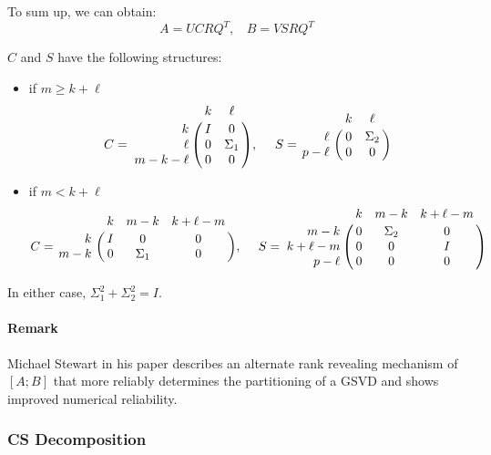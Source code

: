     To sum up, we can obtain:
        \begin{equation} \label{eq-alg-4}
            A = UCRQ^{T}, \ \ \ \ B = VSRQ^{T}
        \end{equation}
    
    $C$ and $S$ have the following structures:
    
    \begin{itemize}
        \item if $m \ge k+\ell$
            \begin{displaymath}
                C = \bordermatrix{ & k & \ell  \cr
                \hfill k & I & 0 \cr
                \hfill \ell & 0 & \Sigma_1 \cr
                m-k-\ell & 0 & 0}, \  \ \ \
                S = \bordermatrix{ & k & \ell \cr
                \hfill \ell & 0 & \Sigma_2 \cr
                \hfill p-\ell & 0 & 0}
            \end{displaymath}
                
        \item if $m < k+\ell$
            \begin{displaymath}
                C = \bordermatrix{ & k & m-k & k+\ell-m  \cr
                \hfill k & I & 0 & 0\cr
                \hfill m-k & 0 & \Sigma_1 & 0}, \  \ \ \
                S = \bordermatrix{ & k & m-k & k+\ell-m \cr
                \hfill m-k & 0 & \Sigma_2 & 0\cr
                \hfill k+\ell-m & 0 & 0 & I\cr
                \hfill p-\ell & 0 & 0 & 0}
            \end{displaymath}
    \end{itemize}
    
    In either case, $\Sigma_1^2 + \Sigma_2^2 = I$.
    
    \paragraph{Remark}
        Michael Stewart in his paper \cite{stewart2016rank} describes an alternate rank revealing mechanism of $[A; B]$ that more reliably determines the partitioning of a GSVD and shows improved numerical reliability.
    
    \subsubsection{CS Decomposition} \label{csd}
